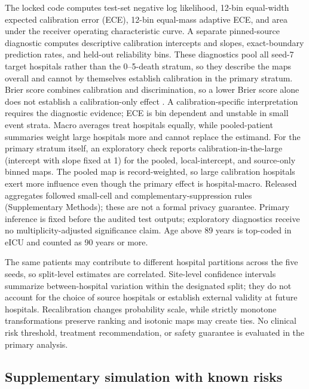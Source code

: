 \documentclass[11pt]{article}
\begin{document}
The locked code computes test-set negative log likelihood, 12-bin equal-width expected calibration error (ECE), 12-bin equal-mass adaptive ECE, and area under the receiver operating characteristic curve. A separate pinned-source diagnostic computes descriptive calibration intercepts and slopes, exact-boundary prediction rates, and held-out reliability bins. These diagnostics pool all seed-7 target hospitals rather than the 0--5-death stratum, so they describe the maps overall and cannot by themselves establish calibration in the primary stratum. Brier score combines calibration and discrimination, so a lower Brier score alone does not establish a calibration-only effect \cite{r3}. A calibration-specific interpretation requires the diagnostic evidence; ECE is bin dependent and unstable in small event strata. Macro averages treat hospitals equally, while pooled-patient summaries weight large hospitals more and cannot replace the estimand. For the primary stratum itself, an exploratory check reports calibration-in-the-large (intercept with slope fixed at 1) for the pooled, local-intercept, and source-only binned maps. The pooled map is record-weighted, so large calibration hospitals exert more influence even though the primary effect is hospital-macro. Released aggregates followed small-cell and complementary-suppression rules (Supplementary Methods); these are not a formal privacy guarantee. Primary inference is fixed before the audited test outputs; exploratory diagnostics receive no multiplicity-adjusted significance claim. Age above 89 years is top-coded in eICU and counted as 90 years or more.

The same patients may contribute to different hospital partitions across the five seeds, so split-level estimates are correlated. Site-level confidence intervals summarize between-hospital variation within the designated split; they do not account for the choice of source hospitals or establish external validity at future hospitals. Recalibration changes probability scale, while strictly monotone transformations preserve ranking and isotonic maps may create ties. No clinical risk threshold, treatment recommendation, or safety guarantee is evaluated in the primary analysis.

\subsection*{Supplementary simulation with known risks}\label{simulation-methods}
\end{document}
